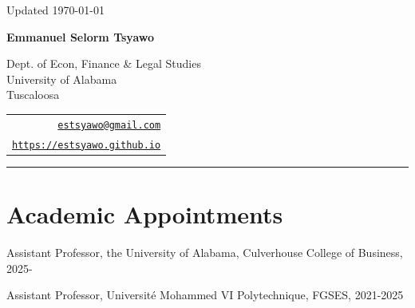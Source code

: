 \documentclass[12pt,letterpaper]{article}
\def\name{Emmanuel Selorm Tsyawo}
\renewenvironment{itemize}{
  \begin{list}{}{
    \setlength{\leftmargin}{1.5em}
  }
}{
  \end{list}
}
\begin{document}
\begin{minipage}{\linewidth}
  \begin{flushright}
    Updated \today
  \end{flushright}
\end{minipage}

\vspace{10pt}


\centerline{\huge \bf \name}

\vspace{0.25in}

\begin{minipage}{0.55\linewidth}
	Dept. of Econ, Finance \& Legal Studies \\
	University of Alabama\\
  Tuscaloosa\\
\end{minipage}
\begin{minipage}{0.42\linewidth}
  \begin{tabular}{r}
    \href{mailto:estsyawo@gmail.com}{\tt estsyawo@gmail.com} \\
    \href{https://estsyawo.github.io}{\tt https://estsyawo.github.io} \\
    
  \end{tabular}
\end{minipage}

\vspace{10pt}
\rule{\linewidth}{0.4pt}


\section*{Academic Appointments}
\begin{itemize}
  \item Assistant Professor, the University of Alabama, Culverhouse College of Business, 2025-
  \item Assistant Professor, Universit\'e Mohammed VI Polytechnique, FGSES, 2021-2025
\end{itemize}
\end{document}
